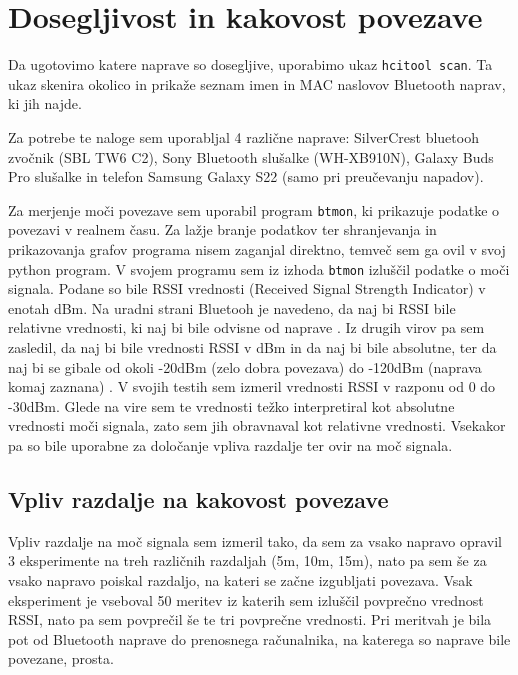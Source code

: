\documentclass[11pt,a4paper,slovene]{article}
\begin{document}
\section{Dosegljivost in kakovost povezave}

Da ugotovimo katere naprave so dosegljive, uporabimo ukaz \texttt{hcitool scan}. Ta ukaz skenira okolico in prikaže seznam imen in MAC naslovov Bluetooth naprav, ki jih najde.

Za potrebe te naloge sem uporabljal 4 različne naprave: SilverCrest bluetooh zvočnik (SBL TW6 C2), Sony Bluetooth slušalke (WH-XB910N), Galaxy Buds Pro slušalke in telefon Samsung Galaxy S22 (samo pri preučevanju napadov).

Za merjenje moči povezave sem uporabil program \texttt{btmon}, ki prikazuje podatke o povezavi v realnem času. Za lažje branje podatkov ter shranjevanja in prikazovanja grafov programa nisem zaganjal direktno, temveč sem ga ovil v svoj python program. V svojem programu sem iz izhoda \texttt{btmon} izluščil podatke o moči signala. Podane so bile RSSI vrednosti (Received Signal Strength Indicator) v enotah dBm. Na uradni strani Bluetooh je navedeno, da naj bi RSSI bile relativne vrednosti, ki naj bi bile odvisne od naprave \cite{bluetooth_com}. Iz drugih virov pa sem zasledil, da naj bi bile vrednosti RSSI v dBm in da naj bi bile absolutne, ter da naj bi se gibale od okoli -20dBm (zelo dobra povezava) do -120dBm (naprava komaj zaznana) \cite{bluetoothle_rssi}. V svojih testih sem izmeril vrednosti RSSI v razponu od 0 do -30dBm. Glede na vire sem te vrednosti težko interpretiral kot absolutne vrednosti moči signala, zato sem jih obravnaval kot relativne vrednosti. Vsekakor pa so bile uporabne za določanje vpliva razdalje ter ovir na moč signala.

\subsection{Vpliv razdalje na kakovost povezave}

Vpliv razdalje na moč signala sem izmeril tako, da sem za vsako napravo opravil 3 eksperimente na treh različnih razdaljah (5m, 10m, 15m), nato pa sem še za vsako napravo poiskal razdaljo, na kateri se začne izgubljati povezava. Vsak eksperiment je vseboval 50 meritev iz katerih sem izluščil povprečno vrednost RSSI, nato pa sem povprečil še te tri povprečne vrednosti. Pri meritvah je bila pot od Bluetooth naprave do prenosnega računalnika, na katerega so naprave bile povezane, prosta.
\end{document}

